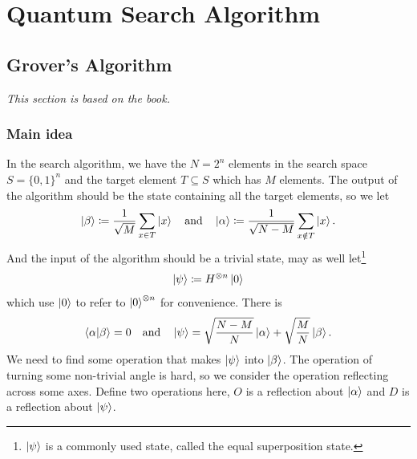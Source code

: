 \documentclass[a4paper,10pt]{book}
\numberwithin{equation}{section}
\begin{document}
\chapter{Quantum Search Algorithm}

\section{Grover's Algorithm}

\textit{This section is based on the book\cite{nielsen2010}.}

\subsection{\label{subsec:GroverMainIdea}Main idea}

In the search algorithm, we have the $N=2^{n}$ elements in the search space $S=\{0,1\}^{n}$ and the target element $T\subseteq S$ which has $M$ elements. The output of the algorithm should be the state containing all the target elements, so we let
\begin{equation}
    \ket{\beta}\coloneqq\frac{1}{\sqrt{M}}\sum_{x\in T}\ket{x}
    \quad\text{and}\quad
    \ket{\alpha}\coloneqq\frac{1}{\sqrt{N-M}}\sum_{x\notin T}\ket{x}.
\end{equation}
And the input of the algorithm should be a trivial state, may as well let\footnote{$\ket{\psi}$ is a commonly used state, called the equal superposition state.}
\begin{equation}
    \ket{\psi}\coloneqq H^{\otimes n}\ket{0}
\end{equation}
which use $\ket{0}$ to refer to $\ket{0}^{\otimes n}$ for convenience. There is
\begin{equation}
    \braket{\alpha|\beta}=0
    \quad\text{and}\quad
    \ket{\psi}=\sqrt{\frac{N-M}{N}}\ket{\alpha}+\sqrt{\frac{M}{N}}\ket{\beta}.
\end{equation}
We need to find some operation that makes $\ket{\psi}$ into $\ket{\beta}$. The operation of turning some non-trivial angle is hard, so we consider the operation reflecting across some axes. Define two operations here, $O$ is a reflection about $\ket{\alpha}$ and $D$ is a reflection about $\ket{\psi}$.
\end{document}
